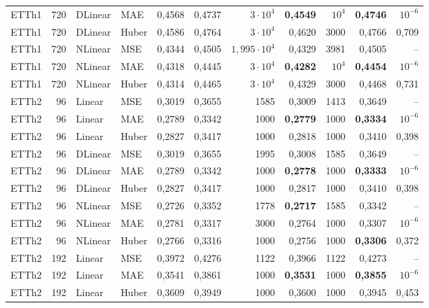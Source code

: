 {\begin{longtable}{@{}lrll rr rr rr r@{}}
ETTh1 & 720 & DLinear & MAE & 0{,}4568 & 0{,}4737 & $3\cdot 10^{4}$ & \textbf{0{,}4549} & $10^{4}$ & \textbf{0{,}4746} & $10^{-6}$ \\
ETTh1 & 720 & DLinear & Huber & 0{,}4586 & 0{,}4764 & $3\cdot 10^{4}$ & 0{,}4620 & 3000 & 0{,}4766 & 0{,}709 \\
\addlinespace[2pt]
ETTh1 & 720 & NLinear & MSE & 0{,}4344 & 0{,}4505 & $1{,}995\cdot 10^{4}$ & 0{,}4329 & 3981 & 0{,}4505 & -- \\
ETTh1 & 720 & NLinear & MAE & 0{,}4318 & 0{,}4445 & $3\cdot 10^{4}$ & \textbf{0{,}4282} & $10^{4}$ & \textbf{0{,}4454} & $10^{-6}$ \\
ETTh1 & 720 & NLinear & Huber & 0{,}4314 & 0{,}4465 & $3\cdot 10^{4}$ & 0{,}4329 & 3000 & 0{,}4468 & 0{,}731 \\
\addlinespace[2pt]
ETTh2 & 96 & Linear & MSE & 0{,}3019 & 0{,}3655 & 1585 & 0{,}3009 & 1413 & 0{,}3649 & -- \\
ETTh2 & 96 & Linear & MAE & 0{,}2789 & 0{,}3342 & 1000 & \textbf{0{,}2779} & 1000 & \textbf{0{,}3334} & $10^{-6}$ \\
ETTh2 & 96 & Linear & Huber & 0{,}2827 & 0{,}3417 & 1000 & 0{,}2818 & 1000 & 0{,}3410 & 0{,}398 \\
\addlinespace[2pt]
ETTh2 & 96 & DLinear & MSE & 0{,}3019 & 0{,}3655 & 1995 & 0{,}3008 & 1585 & 0{,}3649 & -- \\
ETTh2 & 96 & DLinear & MAE & 0{,}2789 & 0{,}3342 & 1000 & \textbf{0{,}2778} & 1000 & \textbf{0{,}3333} & $10^{-6}$ \\
ETTh2 & 96 & DLinear & Huber & 0{,}2827 & 0{,}3417 & 1000 & 0{,}2817 & 1000 & 0{,}3410 & 0{,}398 \\
\addlinespace[2pt]
ETTh2 & 96 & NLinear & MSE & 0{,}2726 & 0{,}3352 & 1778 & \textbf{0{,}2717} & 1585 & 0{,}3342 & -- \\
ETTh2 & 96 & NLinear & MAE & 0{,}2781 & 0{,}3317 & 3000 & 0{,}2764 & 1000 & 0{,}3307 & $10^{-6}$ \\
ETTh2 & 96 & NLinear & Huber & 0{,}2766 & 0{,}3316 & 1000 & 0{,}2756 & 1000 & \textbf{0{,}3306} & 0{,}372 \\
\addlinespace[2pt]
ETTh2 & 192 & Linear & MSE & 0{,}3972 & 0{,}4276 & 1122 & 0{,}3966 & 1122 & 0{,}4273 & -- \\
ETTh2 & 192 & Linear & MAE & 0{,}3541 & 0{,}3861 & 1000 & \textbf{0{,}3531} & 1000 & \textbf{0{,}3855} & $10^{-6}$ \\
ETTh2 & 192 & Linear & Huber & 0{,}3609 & 0{,}3949 & 1000 & 0{,}3600 & 1000 & 0{,}3945 & 0{,}453 \\

\end{longtable}}
